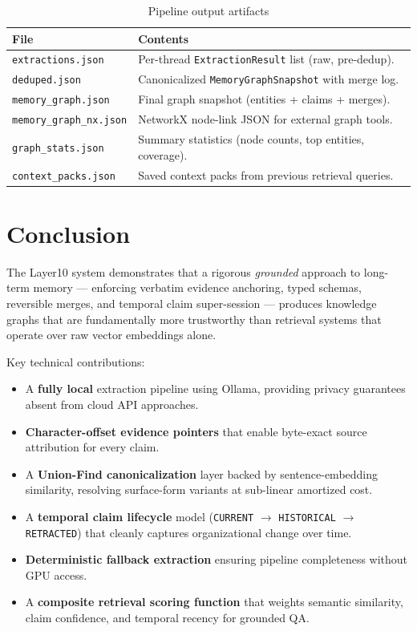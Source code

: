 \documentclass[12pt,a4paper]{article}
\begin{document}
\begin{table}[H]
\centering
\begin{tabular}{@{}ll@{}}
\toprule
\textbf{File} & \textbf{Contents} \\ \midrule
\texttt{extractions.json} & Per-thread \texttt{ExtractionResult} list (raw, pre-dedup). \\
\texttt{deduped.json} & Canonicalized \texttt{MemoryGraphSnapshot} with merge log. \\
\texttt{memory\_graph.json} & Final graph snapshot (entities + claims + merges). \\
\texttt{memory\_graph\_nx.json} & NetworkX node-link JSON for external graph tools. \\
\texttt{graph\_stats.json} & Summary statistics (node counts, top entities, coverage). \\
\texttt{context\_packs.json} & Saved context packs from previous retrieval queries. \\
\bottomrule
\end{tabular}
\caption{Pipeline output artifacts}
\end{table}

\section{Conclusion}

The Layer10 system demonstrates that a rigorous \textit{grounded} approach to long-term memory — enforcing verbatim evidence anchoring, typed schemas, reversible merges, and temporal claim super-session — produces knowledge graphs that are fundamentally more trustworthy than retrieval systems that operate over raw vector embeddings alone.

Key technical contributions:
\begin{itemize}
    \item A \textbf{fully local} extraction pipeline using Ollama, providing privacy guarantees absent from cloud API approaches.
    \item \textbf{Character-offset evidence pointers} that enable byte-exact source attribution for every claim.
    \item A \textbf{Union-Find canonicalization} layer backed by sentence-embedding similarity, resolving surface-form variants at sub-linear amortized cost.
    \item A \textbf{temporal claim lifecycle} model (\texttt{CURRENT} $\to$ \texttt{HISTORICAL} $\to$ \texttt{RETRACTED}) that cleanly captures organizational change over time.
    \item \textbf{Deterministic fallback extraction} ensuring pipeline completeness without GPU access.
    \item A \textbf{composite retrieval scoring function} that weights semantic similarity, claim confidence, and temporal recency for grounded QA.
\end{itemize}
\end{document}
